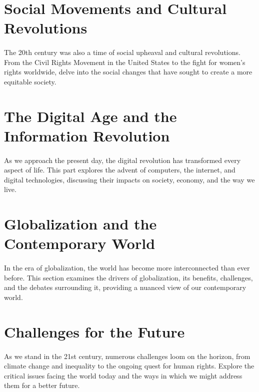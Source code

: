\documentclass[a4paper,12pt]{book}
\begin{document}
\section*{Social Movements and Cultural Revolutions}
\paragraph{}
The 20th century was also a time of social upheaval and cultural revolutions. From the Civil Rights Movement in the United States to the fight for women's rights worldwide, delve into the social changes that have sought to create a more equitable society.

\section*{The Digital Age and the Information Revolution}
\paragraph{}
As we approach the present day, the digital revolution has transformed every aspect of life. This part explores the advent of computers, the internet, and digital technologies, discussing their impacts on society, economy, and the way we live.

\section*{Globalization and the Contemporary World}
\paragraph{}
In the era of globalization, the world has become more interconnected than ever before. This section examines the drivers of globalization, its benefits, challenges, and the debates surrounding it, providing a nuanced view of our contemporary world.

\section*{Challenges for the Future}
\paragraph{}
As we stand in the 21st century, numerous challenges loom on the horizon, from climate change and inequality to the ongoing quest for human rights. Explore the critical issues facing the world today and the ways in which we might address them for a better future.
\end{document}

